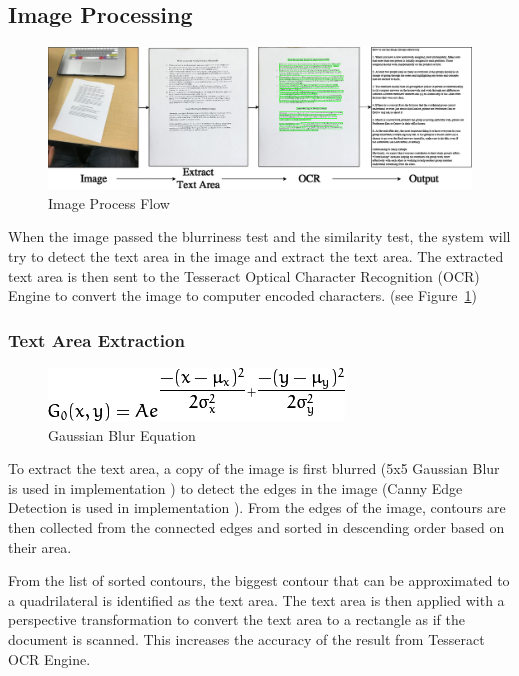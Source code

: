 \subsection{Image Processing}
\begin{figure}
	\centering
    \includegraphics[scale = 0.4]{ImageProcess.png}
    
    \caption{Image Process Flow}
	\label{imageProcessFlow}
\end{figure}
When the image passed the blurriness test and the similarity test, the system will try to detect the text area in the image and extract the text area. The extracted text area is then sent to the Tesseract Optical Character Recognition (OCR) Engine to convert the image to computer encoded characters. (see Figure~\ref{imageProcessFlow})

\subsubsection{Text Area Extraction}
\begin{figure}
	\centering
    \includegraphics[scale = 1]{gaussianBlur.png}
    
    \caption{Gaussian Blur Equation}
	\label{GaussianBlurEquation}
\end{figure}
To extract the text area, a copy of the image is first blurred (5x5 Gaussian Blur is used in implementation \cite{gaussianBlur}) to detect the edges in the image (Canny Edge Detection is used in implementation \cite{canny}). From the edges of the image, contours are then collected \cite{contours} from the connected edges and sorted in descending order based on their area.

From the list of sorted contours, the biggest contour that can be approximated to a quadrilateral is identified as the text area. The text area is then applied with a perspective transformation to convert the text area to a rectangle	 as if the document is scanned. This increases the accuracy of the result from Tesseract OCR Engine. 

